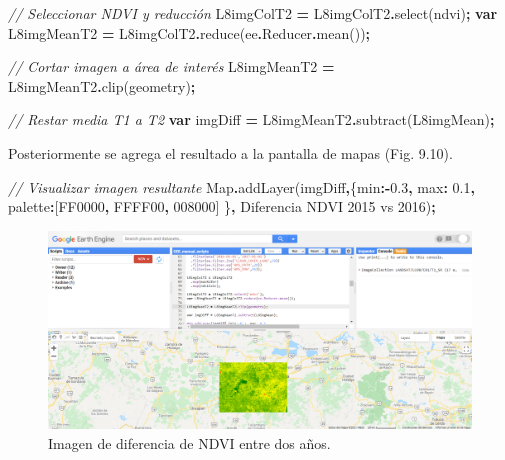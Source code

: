 \documentclass[
  12pt,
  letterpaper,
  twoside]{book}
\newenvironment{Shaded}{\begin{snugshade}}{\end{snugshade}}
\newcommand{\AttributeTok}[1]{\textcolor[rgb]{0.77,0.63,0.00}{#1}}
\newcommand{\BuiltInTok}[1]{#1}
\newcommand{\CommentTok}[1]{\textcolor[rgb]{0.56,0.35,0.01}{\textit{#1}}}
\newcommand{\DataTypeTok}[1]{\textcolor[rgb]{0.13,0.29,0.53}{#1}}
\newcommand{\FloatTok}[1]{\textcolor[rgb]{0.00,0.00,0.81}{#1}}
\newcommand{\FunctionTok}[1]{\textcolor[rgb]{0.00,0.00,0.00}{#1}}
\newcommand{\KeywordTok}[1]{\textcolor[rgb]{0.13,0.29,0.53}{\textbf{#1}}}
\newcommand{\NormalTok}[1]{#1}
\newcommand{\OperatorTok}[1]{\textcolor[rgb]{0.81,0.36,0.00}{\textbf{#1}}}
\newcommand{\StringTok}[1]{\textcolor[rgb]{0.31,0.60,0.02}{#1}}
\begin{document}
\begin{Shaded}
\begin{Highlighting}[]
\CommentTok{// Seleccionar NDVI y reducción}
\NormalTok{L8imgColT2 }\OperatorTok{=}\NormalTok{ L8imgColT2}\OperatorTok{.}\FunctionTok{select}\NormalTok{(}\StringTok{\textquotesingle{}ndvi\textquotesingle{}}\NormalTok{)}\OperatorTok{;}
\KeywordTok{var}\NormalTok{ L8imgMeanT2 }\OperatorTok{=}\NormalTok{ L8imgColT2}\OperatorTok{.}\FunctionTok{reduce}\NormalTok{(ee}\OperatorTok{.}\AttributeTok{Reducer}\OperatorTok{.}\FunctionTok{mean}\NormalTok{())}\OperatorTok{;}

\CommentTok{// Cortar imagen a área de interés}
\NormalTok{L8imgMeanT2 }\OperatorTok{=}\NormalTok{ L8imgMeanT2}\OperatorTok{.}\FunctionTok{clip}\NormalTok{(geometry)}\OperatorTok{;}

\CommentTok{// Restar media T1 a T2}
\KeywordTok{var}\NormalTok{ imgDiff }\OperatorTok{=}\NormalTok{ L8imgMeanT2}\OperatorTok{.}\FunctionTok{subtract}\NormalTok{(L8imgMean)}\OperatorTok{;}  
\end{Highlighting}
\end{Shaded}

Posteriormente se agrega el resultado a la pantalla de mapas (Fig. 9.10).

\begin{Shaded}
\begin{Highlighting}[]
\CommentTok{// Visualizar imagen resultante}
\BuiltInTok{Map}\OperatorTok{.}\FunctionTok{addLayer}\NormalTok{(imgDiff}\OperatorTok{,}\NormalTok{\{}\DataTypeTok{min}\OperatorTok{:{-}}\FloatTok{0.3}\OperatorTok{,} \DataTypeTok{max}\OperatorTok{:} \FloatTok{0.1}\OperatorTok{,} 
  \DataTypeTok{palette}\OperatorTok{:}\NormalTok{[}\StringTok{\textquotesingle{}FF0000\textquotesingle{}}\OperatorTok{,} \StringTok{\textquotesingle{}FFFF00\textquotesingle{}}\OperatorTok{,} \StringTok{\textquotesingle{}008000\textquotesingle{}}\NormalTok{] \}}\OperatorTok{,} 
  \StringTok{\textquotesingle{}Diferencia NDVI 2015 vs 2016\textquotesingle{}}\NormalTok{)}\OperatorTok{;}
\end{Highlighting}
\end{Shaded}

\begin{figure}[btp]

{\centering \includegraphics[width=1\linewidth]{Img/imDifNDVI} 

}

\caption{Imagen de diferencia de NDVI entre dos años.}\label{fig:unnamed-chunk-172}
\end{figure}
\end{document}
